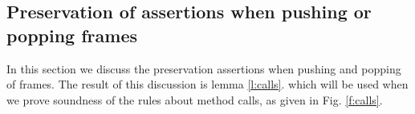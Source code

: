 

\subsection{Preservation of assertions when pushing or popping frames}

In this section we  discuss the preservation  assertions when pushing and popping of frames. 
The result of this discussion is  lemma \ref{l:calls}. 
 which will be used when we prove soundness of the rules about method calls, as given in Fig. \ref{f:calls}. 

 
